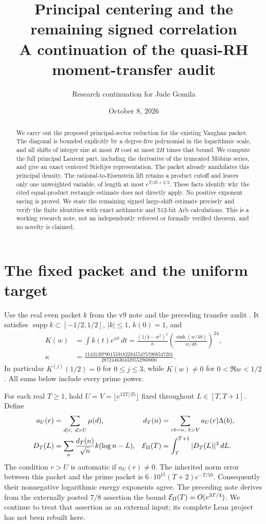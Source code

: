 \documentclass[11pt]{article}
\title{Principal centering and the remaining signed correlation\\[4pt]
\large A continuation of the quasi-RH moment-transfer audit}
\author{Research continuation for Jude Gomila}\date{October 8, 2026}
\newcommand{\dd}{\,d}\newcommand{\E}{\mathcal E}\newcommand{\C}{\mathcal C}
\begin{document}
\maketitle
\begin{abstract}
We carry out the proposed principal-sector reduction for the existing
Vaughan packet. The diagonal is bounded explicitly by a degree-five
polynomial in the logarithmic scale, and all shifts of integer size at
most $H$ cost at most $2H$ times that bound. We compute the full principal
Laurent part, including the derivative of the truncated M\"obius series,
and give an exact centered Stieltjes representation. The packet already
annihilates this principal density. The rational-to-Eisenstein lift
retains a product cutoff and leaves only one unweighted variable, of
length at most $e^{T/25+3/2}$. These facts identify why the cited
equal-product rectangle estimate does not directly apply. No positive
exponent saving is proved. We state the remaining signed large-shift
estimate precisely and verify the finite identities with exact arithmetic
and 512-bit Arb calculations. This is a working research note, not an
independently refereed or formally verified theorem, and no novelty is claimed.
\end{abstract}

\section{The fixed packet and the uniform target}
Use the real even packet $k$ from the v9 note and the preceding transfer
audit \cite{v9,transfer}. It satisfies $\operatorname{supp}k\subset[-1/2,1/2]$,
$|k|\le1$, $k(0)=1$, and
\begin{equation}\label{K}
 \begin{aligned}
 K(w)&=\int k(t)e^{wt}\dd t
 =\frac{(1/4-w^2)^4}{\kappa}
       \left(\frac{\sinh(w/48)}{w/48}\right)^{24},\\
 \kappa&=\frac{11431397901559182284554757008547201}{2872446304320552960000}.
 \end{aligned}
\end{equation}
In particular $K^{(j)}(1/2)=0$ for $0\le j\le3$, while
$K(w)\ne0$ for $0<\Re w<1/2$. All sums below include every prime power.

For each real $T\ge1$, hold $U=V=\lfloor e^{12T/25}\rfloor$ fixed
throughout $L\in[T,T+1]$. Define
\begin{align}
 a_U(r)&=\sum_{d\mid r,\ d>U}\mu(d), &
 d_T(n)&=\sum_{rb=n,\ b>V}a_U(r)\Lambda(b),\label{d}\\
 D_T(L)&=\sum_n\frac{d_T(n)}{\sqrt n}k(\log n-L),&
 \E_{\rm II}(T)&=\int_T^{T+1}|D_T(L)|^2\dd L.\label{energy}
\end{align}
The condition $r>U$ is automatic if $a_U(r)\ne0$.
The inherited norm error between this packet and the prime packet is
$6\cdot10^{15}(T+2)e^{-T/50}$. Consequently their nonnegative logarithmic
energy exponents agree. The preceding note derives from the externally
posted $7/8$ assertion the bound $\E_{\rm II}(T)=O(e^{3T/4})$.
We continue to treat that assertion as an external input; its complete
Lean project has not been rebuilt here.
\end{document}
